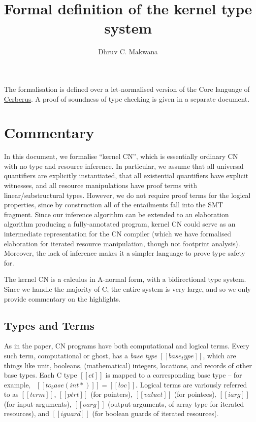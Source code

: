 \documentclass[11pt]{article}%
\title{\vspace{-2cm} Formal definition of the kernel type system}
\author{Dhruv C. Makwana}
\date{}
\begin{document}
\maketitle%


\noindent
The formalisation is defined
over a let-normalised version of the Core language of
\href{https://github.com/rems-project/cerberus}{Cerberus}. A proof of soundness
of type checking is given in a separate document.

{\let\clearpage\relax \tableofcontents}

\section{Commentary}
\label{sec:commentary}

In this document, we formalise ``kernel CN'',
which is essentially ordinary CN with no type and
resource inference. In particular, we assume that all
universal quantifiers are explicitly instantiated, that all
existential quantifiers have explicit witnesses, and all resource
manipulations have proof terms with linear/substructural
types. However, we do not require proof terms for the logical
properties, since by construction all of the entailments fall
into the SMT fragment. Since our inference algorithm can be extended
to an elaboration algorithm producing a fully-annotated program,
kernel CN could serve as an intermediate representation for the CN
compiler (which we have formalised elaboration for iterated resource
manipulation, though not footprint analysis).
Moreover, the lack of inference makes it a simpler language
to prove type safety for.

The kernel CN is a calculus in A-normal form, with a bidirectional
type system. Since we handle the majority of C, the entire system is very
large, and so we only provide commentary on the highlights.

\subsection{Types and Terms}

As in the paper, CN programs have both computational and logical terms.
Every such term, computational or ghost, has a \emph{base type} $[[ base_type ]]$,
which are things like unit, booleans, (mathematical) integers, locations,
and records of other base types. Each C type $[[ ct ]]$ is mapped to a
corresponding base type -- for example, \ $[[ to_base ( int * ) ]] = [[ loc ]]$.
Logical terms are variously referred to as $[[ term ]]$, $[[ ptrt ]]$
(for pointers), $[[ valuet ]]$ (for pointees), $[[ iarg ]]$ (for
input-arguments), $[[ oarg ]]$ (output-arguments, of array type for
iterated resources), and $[[ iguard ]]$ (for boolean guards of iterated resources).
\end{document}
